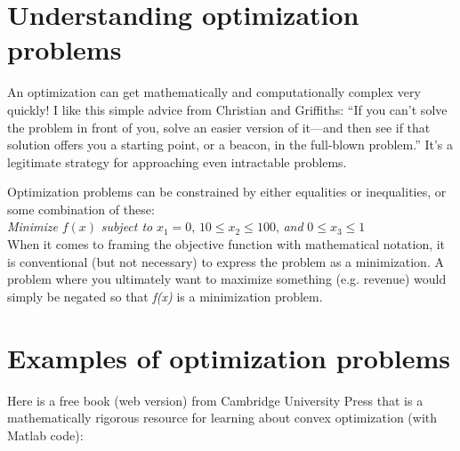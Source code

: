 \documentclass[10pt]{article}
\begin{document}
\section{Understanding optimization problems}

An optimization can get mathematically and computationally complex very quickly! I like this simple advice from Christian and Griffiths: ``If you can't solve the problem in front of you, solve an easier version of it---and then see if that solution offers you a starting point, or a beacon, in the full-blown problem.''\cite{Christian2016-ug} It's a legitimate strategy for approaching even intractable problems.

Optimization problems can be constrained by either equalities or inequalities, or some combination of these: \\

\textit{Minimize }$f(x)$ \textit{subject to} $x_1=0$, $10 \leq x_2 \leq 100$, \textit{and} $0 \leq x_3 \leq 1$\\

When it comes to framing the objective function with mathematical notation, it is conventional (but not necessary) to express the problem as a minimization. A problem where you ultimately want to maximize something (e.g. revenue) would simply be negated so that \textit{f(x)} is a minimization problem.

\section{Examples of  optimization problems}





Here is a free book (web version) from Cambridge University Press that is a mathematically rigorous resource for learning about convex optimization (with Matlab code):\\
\end{document}
